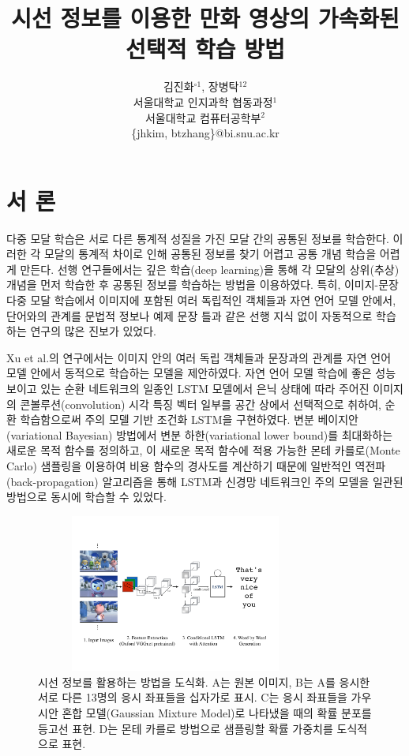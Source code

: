 \documentclass{kcc}
\title{시선 정보를 이용한 만화 영상의 가속화된 선택적 학습 방법}
\author{
김진화$^{\circ1}$, 장병탁$^{12}$\\
서울대학교 인지과학 협동과정$^{1}$\\
서울대학교 컴퓨터공학부$^{2}$\\
\{jhkim, btzhang\}@bi.snu.ac.kr
}
\begin{document}
\maketitle


\section{서 론}

다중 모달 학습은 서로 다른 통계적 성질을 가진 모달 간의 공통된 정보를 학습한다. 이러한 각 모달의 통계적 차이로 인해 공통된 정보를 찾기 어렵고 공통 개념 학습을 어렵게 만든다. 선행 연구들에서는 깊은 학습(deep learning)을 통해 각 모달의 상위(추상) 개념을 먼저 학습한 후 공통된 정보를 학습하는 방법을 이용하였다\cite{Ngiam2011,NIPS2012_4683,Kiros2014,NIPS2014_5279}. 특히, 이미지-문장 다중 모달 학습에서 이미지에 포함된 여러 독립적인 객체들과 자연 언어 모델 안에서, 단어와의 관계를 문법적 정보나 예제 문장 틀과 같은 선행 지식 없이 자동적으로 학습하는 연구의 많은 진보가 있었다\cite{Kiros2014,Yu2013,Karpathy}.

Xu et al.\cite{Xu2015}의 연구에서는 이미지 안의 여러 독립 객체들과 문장과의 관계를 자연 언어 모델 안에서 동적으로 학습하는 모델을 제안하였다. 자연 언어 모델 학습에 좋은 성능 보이고 있는 순환 네트워크의 일종인 LSTM 모델에서 은닉 상태에 따라 주어진 이미지의 콘볼루션(convolution) 시각 특징 벡터 일부를 공간 상에서 선택적으로 취하여\cite{Oh2011,zhang1994accelerated}, 순환 학습함으로써 주의 모델 기반 조건화 LSTM을 구현하였다. 변분 베이지안(variational Bayesian) 방법에서 변분 하한(variational lower bound)를 최대화하는 새로운 목적 함수를 정의하고, 이 새로운 목적 함수에 적용 가능한 몬테 카를로(Monte Carlo) 샘플링을 이용하여 비용 함수의 경사도를 계산하기 때문에 일반적인 역전파(back-propagation) 알고리즘을 통해 LSTM과 신경망 네트워크인 주의 모델을 일관된 방법으로 동시에 학습할 수 있었다.

\begin{figure}[ht!]
  \centerline{\includegraphics[width=92mm,height=52mm,trim=15mm 40mm 15mm 40mm]{eps/pororo_alstm.pdf}}
  \caption{시선 정보를 활용하는 방법을 도식화. A는 원본 이미지, B는 A를 응시한 서로 다른 13명의 응시 좌표들을 십자가로 표시. C는 응시 좌표들을 가우시안 혼합 모델(Gaussian Mixture Model)로 나타냈을 때의 확률 분포를 등고선 표현. D는 몬테 카를로 방법으로 샘플링할 확률 가중치를 도식적으로 표현.}
  \label{fig:selective}
\end{figure}
\end{document}
